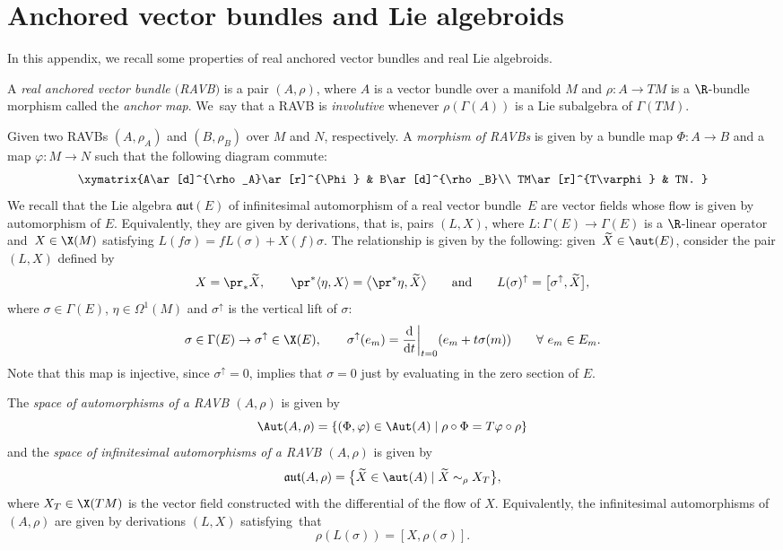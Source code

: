 \appendix

\section{Anchored vector bundles and Lie algebroids}\label{preliminaries0}
In this appendix, we recall some properties of real anchored vector bundles and real Lie algebroids.
\begin{Definition}
   A {\em real anchored vector bundle $($RAVB$)$} is a pair $(A, \rho)$, where $A$ is a vector bundle over a manifold $M$ and $\rho\colon A\to TM$ is a $\R$-bundle morphism called the {\em anchor map}. We~say that a RAVB is {\em involutive} whenever $\rho(\Gamma(A))$ is a Lie subalgebra of $\Gamma(TM)$.
\end{Definition}
Given two RAVBs $(A,\rho_A)$ and $(B,\rho_B)$ over $M$ and $N$, respectively. A {\em morphism of RAVBs} is given by a bundle map $\Phi\colon A\to B$ and a map $\varphi\colon M\to N$ such that the following diagram commute:
\[\xymatrix{A\ar[d]^{\rho_A}\ar[r]^{\Phi} & B\ar[d]^{\rho_B}\\ TM\ar[r]^{T\varphi} & TN.
}\]
We recall that the Lie algebra $\mathfrak{aut}(E)$ of infinitesimal automorphism of a real vector bundle~$E$ are vector fields  whose flow is given by automorphism of $E$. Equivalently, they are given by derivations, that is, pairs $(L,X)$, where $L\colon \Gamma(E)\to \Gamma(E)$ is a $\R$-linear operator and~${X\in \X(M)}$ satisfying $L(f\sigma)=fL(\sigma)+X(f)\sigma$. The relationship is given by the following: given~${\widetilde{X}\in \aut(E)}$, consider the pair $(L,X)$ defined by
\[
X=\pr_* \widetilde{X},\qquad \pr^*\langle \eta, X \rangle=\bigl\langle \pr^*\eta,\widetilde{X} \bigr\rangle\qquad \text{and}\qquad
L(\sigma)^{\uparrow}=\bigl[\sigma^{\uparrow},\widetilde{X}\bigr],
\]
where $\sigma\in \Gamma(E)$, $\eta\in \Omega^{1}(M)$ and $\sigma^{\uparrow}$ is the vertical lift of $\sigma$:
\begin{align*}
   \sigma\in \Gamma(E)\to \sigma^{\uparrow}\in\X(E),\qquad
 \sigma^{\uparrow}(e_m)=\frac{{\rm d}}{{\rm d}t}\bigg\rvert_{t=0}(e_m+t\sigma(m))\qquad\forall\ e_m\in E_m.
 \end{align*}
 Note that this map is injective, since $\sigma^{\uparrow}=0$, implies that $\sigma=0$ just by evaluating in the zero section of $E$.

 The {\em space of automorphisms of a RAVB $(A,\rho)$} is given by
 \[\Aut(A,\rho)=\{(\Phi, \varphi)\in \Aut(A)\mid \rho\circ\Phi=T\varphi\circ \rho\}\]
 and the {\em space of infinitesimal automorphisms of a RAVB $(A,\rho)$} is given by
 \[\mathfrak{aut}(A,\rho)=\big\{ \widetilde{X}\in \aut(A)\mid \widetilde{X}\sim_{\rho} X_T \big\},\]
 where $X_T\in \X(TM)$ is the vector field constructed with the differential of the flow of $X$. Equivalently, the infinitesimal automorphisms of $(A,\rho)$ are given by derivations $(L,X)$ satisfying~that
 \[\rho(L(\sigma))=[X, \rho(\sigma)].\]


